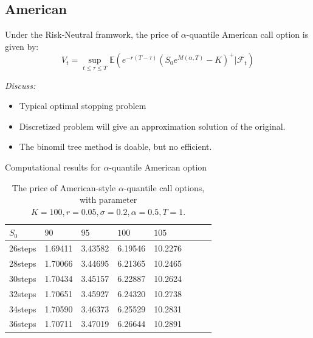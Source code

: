 \documentclass[cjk,10pt]{beamer}
\begin{document}
\subsection{American}
\begin{frame}
Under the Risk-Neutral framwork, the price of $\alpha$-quantile American call option
is given by:
\[
V_t = \sup_{t \leq\tau\leq T}
\mathbb{E}\left(e^{-r(T-\tau)}(S_0 e^{M(\alpha,T)} - K)^+|\mathcal{F}_t\right)
\] 

{\em Discuss:}
\begin{itemize}
\item Typical optimal stopping problem
\item Discretized problem will give an approximation solution of the original. 
\item The binomil tree method is doable, but no efficient.
\end{itemize}
\end{frame}

\begin{frame}{Computational results for $\alpha$-quantile American option}
\begin{table}[p]
\caption{The price of American-style $\alpha$-quantile call options, with parameter
	$K=100, r=0.05, \sigma=0.2, \alpha=0.5, T=1$. 
	}
\begin{center}
\begin{tabular}{l|lllllll}
$S_0$ & $90$ & $95$ & $100$ & $105$ \\
\hline
26steps & 1.69411 & 3.43582 & 6.19546 & 10.2276 \\
28steps & 1.70066 & 3.44695 & 6.21365 & 10.2465 \\
30steps & 1.70434 & 3.45157 & 6.22887 & 10.2624 \\
32steps & 1.70651 & 3.45927 & 6.24320 & 10.2738 \\
34steps & 1.70590 & 3.46373 & 6.25529 & 10.2831 \\
36steps & 1.70711 & 3.47019 & 6.26644 & 10.2891 \\
\end{tabular}
\end{center}
\label{fig:amer5}
\end{table}
\end{frame}
\end{document}
